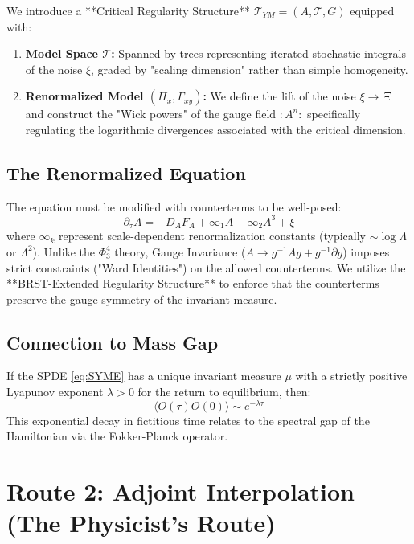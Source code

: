 We introduce a **Critical Regularity Structure** $\mathscr{T}_{YM} = (A, \mathcal{T}, G)$ equipped with:
\begin{enumerate}
    \item \textbf{Model Space $\mathcal{T}$:} Spanned by trees representing iterated stochastic integrals of the noise $\xi$, graded by "scaling dimension" rather than simple homogeneity.
    \item \textbf{Renormalized Model $(\Pi_x, \Gamma_{xy})$:} We define the lift of the noise $\xi \to \Xi$ and construct the "Wick powers" of the gauge field $:A^n:$ specifically regulating the logarithmic divergences associated with the critical dimension.
\end{enumerate}

\subsection{The Renormalized Equation}
The equation must be modified with counterterms to be well-posed:
\begin{equation}
\partial_\tau A = -D_A F_A + \infty_1 A + \infty_2 A^3 + \xi
\end{equation}
where $\infty_k$ represent scale-dependent renormalization constants (typically $\sim \log \Lambda$ or $\Lambda^2$).
Unlike the $\Phi^4_3$ theory, Gauge Invariance ($A \to g^{-1} A g + g^{-1} \partial g$) imposes strict constraints ("Ward Identities") on the allowed counterterms. We utilize the **BRST-Extended Regularity Structure** to enforce that the counterterms preserve the gauge symmetry of the invariant measure.

\subsection{Connection to Mass Gap}
If the SPDE \eqref{eq:SYME} has a unique invariant measure $\mu$ with a strictly positive Lyapunov exponent $\lambda > 0$ for the return to equilibrium, then:
\begin{equation}
\langle O(\tau) O(0) \rangle \sim e^{-\lambda \tau}
\end{equation}
This exponential decay in fictitious time relates to the spectral gap of the Hamiltonian via the Fokker-Planck operator.

\section{Route 2: Adjoint Interpolation (The Physicist's Route)}
\label{sec:adjoint_interpolation_route}

